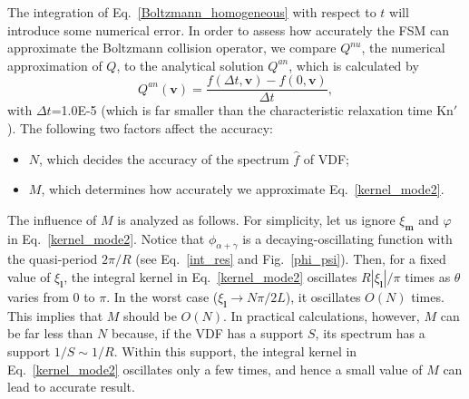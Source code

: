 The integration of Eq.~\eqref{Boltzmann_homogeneous} with respect to $t$ will introduce some numerical error. In order to assess how accurately the FSM can approximate the Boltzmann collision operator, we compare $Q^{nu}$, the numerical approximation of $Q$, to the analytical solution $Q^{an}$, which is calculated by
\begin{equation}
Q^{an}(\bm{v})=\frac{f(\Delta{t},\bm{v})-f(0,\bm{v})}{\Delta{t}},
\end{equation}
with $\Delta{t}$=1.0E-5 (which is far smaller than the characteristic relaxation time $\text{Kn}'$). The following two factors affect the accuracy:
\begin{itemize}
	\item $N$, which decides the accuracy of the spectrum $\hat{f}$ of VDF;
	\item $M$, which determines how accurately we approximate Eq.~\eqref{kernel_mode2}.
\end{itemize}

The influence of $M$ is analyzed as follows. For simplicity, let us ignore $\xi_{\bm{m}}$ and $\varphi$ in Eq.~\eqref{kernel_mode2}. Notice that $\phi_{\alpha+\gamma}$ is a decaying-oscillating function with the quasi-period $2\pi/R$ (see Eq.~\eqref{int_res} and Fig.~\ref{phi_psi}). Then, for a fixed value of $\xi_{\bm{l}}$, the integral kernel in Eq.~\eqref{kernel_mode2} oscillates $R|\xi_{\bm{l}}|/\pi$ times as $\theta$ varies from 0 to $\pi$. In the worst case ($\xi_{\bm{l}}\rightarrow{}N\pi/2L$), it oscillates $O(N)$ times. This implies that $M$ should be $O(N)$. In practical calculations, however, $M$ can be far less than $N$ because, if the VDF has a support $S$, its spectrum has a support $1/S\sim{1/R}$. Within this support, the integral kernel in Eq.~\eqref{kernel_mode2} oscillates only a few times, and hence a small value of $M$ can lead to accurate result.


